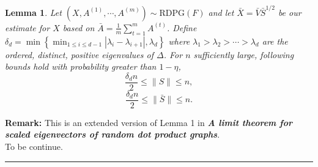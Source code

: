 \documentclass[a4paper]{article}
\newenvironment{proof}{{\bf Proof:  }}{\hfill\rule{2mm}{2mm}}
\newtheorem{lemma}[fact]{Lemma}
\begin{document}
\begin{lemma}
\label{lm:Snorm}
Let $(X, A^{(1)}, \cdots, A^{(m)}) \sim \mathrm{RDPG}(F)$ and let $\bar{X} = \bar{V} \bar{S}^{1/2}$ be our estimate for $X$ based on $\bar{A} = \frac{1}{m} \sum_{t = 1}^m A^{(t)}$.
Define $\delta_d = \min \left\{ \min_{1 \le i \le d-1} |\lambda_i - \lambda_{i+1}|, \lambda_d \right\}$ where $\lambda_1 > \lambda_2 > \cdots > \lambda_d$ are the ordered, distinct, positive eigenvalues of $\Delta$. For $n$ sufficiently large, following bounds hold with probability greater than $1-\eta$,
\[
	\frac{\delta_d n}{2} \le \|S\| \le n,
\]
\[
	\frac{\delta_d n}{2} \le \|\bar{S}\| \le n.
\]
\end{lemma}
\textbf{Remark:} This is an extended version of Lemma 1 in \textbf{\textit{A limit theorem for scaled eigenvectors of random dot product graphs}}. \\
\noindent
\begin{proof}
To be continue.
\end{proof}
\end{document}
